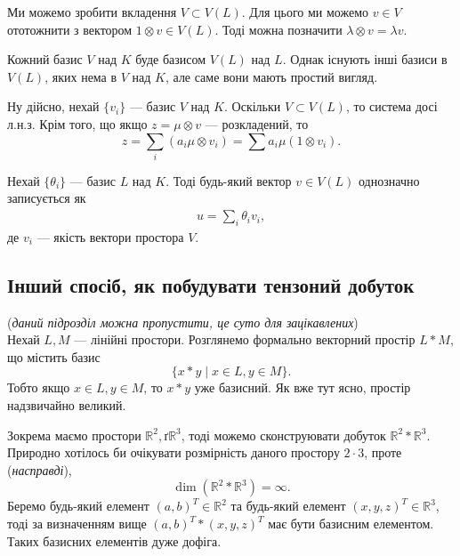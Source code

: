 \documentclass{math_library}
\begin{document}
\begin{remark}
Ми можемо зробити вкладення $V \subset V(L)$. Для цього ми можемо $v \in V$ ототожнити з вектором $1 \otimes v \in V(L)$. Тоді можна позначити $\lambda \otimes v = \lambda v$.
\end{remark}

\begin{remark}
Кожний базис $V$ над $K$ буде базисом $V(L)$ над $L$. Однак існують інші базиси в $V(L)$, яких нема в $V$ над $K$, але саме вони мають простий вигляд. 
\end{remark}

Ну дійсно, нехай $\{v_i\}$ --- базис $V$ над $K$. Оскільки $V \subset V(L)$, то система досі л.н.з. Крім того, що якщо $z = \mu \otimes v$ --- розкладений, то
\[
z = \sum_i (a_i \mu \otimes v_i) = \sum a_i \mu (1 \otimes v_i).
\]

Нехай $\{\theta_i\}$ --- базис $L$ над $K$. Тоді будь-який вектор $v \in V(L)$ однозначно записується як
\begin{align*}
u = \sum_i \theta_i v_i,
\end{align*}
де $v_i$ --- якість вектори простора $V$.
\fi

\subsection{Інший спосіб, як побудувати тензоний добуток}
(\textit{даний підрозділ можна пропустити, це суто для зацікавлених})
\bigskip \\
Нехай $L,M$ --- лінійні простори. Розглянемо формально векторний простір $L*M$, що містить базис 
\[
\{ x*y \mid x \in L, y \in M \}.
\]
Тобто якщо $x \in L, y \in M$, то $x*y$ уже базисний. Як вже тут ясно, простір надзвичайно великий.

\begin{example}
Зокрема маємо простори $\mathbb{R}^2,ґ \mathbb{R}^3$, тоді можемо сконструювати добуток $\mathbb{R}^2 * \mathbb{R}^3$. Природно хотілось би очікувати розмірність даного простору $2 \cdot 3$, проте (\textit{насправді}), 
\[
\dim (\mathbb{R}^2 * \mathbb{R}^3) = \infty.
\] Беремо будь-який елемент $(a,b)^T \in \mathbb{R}^2$ та будь-який елемент $(x,y,z)^T \in \mathbb{R}^3$, тоді за визначенням вище $(a,b)^T * (x,y,z)^T$ має бути базисним елементом. Таких базисних елементів дуже дофіга.
\end{example}
\end{document}
